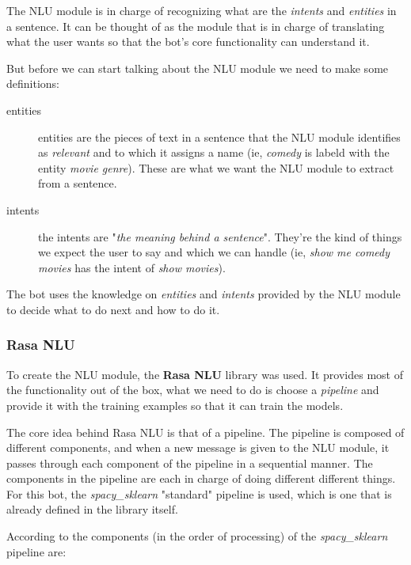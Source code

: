 \documentclass[11pt,a4paper]{article}
\begin{document}
		The NLU module is in charge of recognizing what are the \textit{intents} and \textit{entities} in a sentence. It can be thought of as the module that is in charge of translating what the user wants so that the bot's core functionality can understand it. 
		
		But before we can start talking about the NLU module we need to make some definitions:
		
		\begin{description}
			\item[entities] entities are the pieces of text in a sentence that the NLU module identifies as \textit{relevant} and to which it assigns a name (ie, \textit{comedy} is labeld with the entity \textit{movie genre}). These are what we want the NLU module to extract from a sentence.
			\item[intents] the intents are "\textit{the meaning behind a sentence}". They're the kind of things we expect the user to say and which we can handle (ie, \textit{show me comedy movies} has the intent of \textit{show movies}). 
		\end{description}
	
		The bot uses the knowledge on \textit{entities} and \textit{intents} provided by the NLU module to decide what to do next and how to do it.
		
		\subsubsection{Rasa NLU}
		\label{ssec-rasa-nlu}
			
			To create the NLU module, the \textbf{Rasa NLU} \cite{rasanlu} library was used. It provides most of the functionality out of the box, what we need to do is choose a \textit{pipeline} and provide it with the training examples so that it can train the models.
			
			The core idea behind Rasa NLU is that of a pipeline. The pipeline is composed of different components, and when a new message is given to the NLU module, it passes through each component of the pipeline in a sequential manner. The components in the pipeline are each in charge of doing different different things. For this bot, the \textit{spacy\_sklearn} "standard" pipeline is  used, which is one that is already defined in the library itself. 
			
			According to \cite{rasanichol} the components (in the order of processing) of the \textit{spacy\_sklearn} pipeline are:
			
\end{document}

